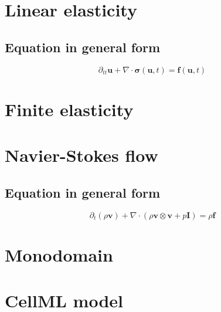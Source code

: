 \documentclass[
10pt, %
a4paper, %
oneside, %
headinclude,footinclude, %
BCOR5mm, %
]{scrartcl}
\begin{document}
\section{Linear elasticity}
%
\subsection{Equation in general form}
%
\begin{equation}
    \partial_{tt} \boldsymbol{u} + \nabla \cdot \boldsymbol{\sigma} (\boldsymbol{u}, t) = \boldsymbol{f} (\boldsymbol{u}, t)
\end{equation}
%

%

%

%

%
\clearpage
%
\section{Finite elasticity}
%
%
%
%
\clearpage
%
\section{Navier-Stokes flow}
%
\subsection{Equation in general form}
%
\begin{equation}
    \partial_{t} (\rho \boldsymbol{v}) + \nabla \cdot (\rho \boldsymbol{v} \otimes \boldsymbol{v} + p \boldsymbol{I}) = \rho \boldsymbol{f}
\end{equation}
%
%
%

%
%
\clearpage
%
\section{Monodomain}
%



%
%
\clearpage
%
\section{CellML model}
%
%
%
%
%
\clearpage
%


\end{document}

